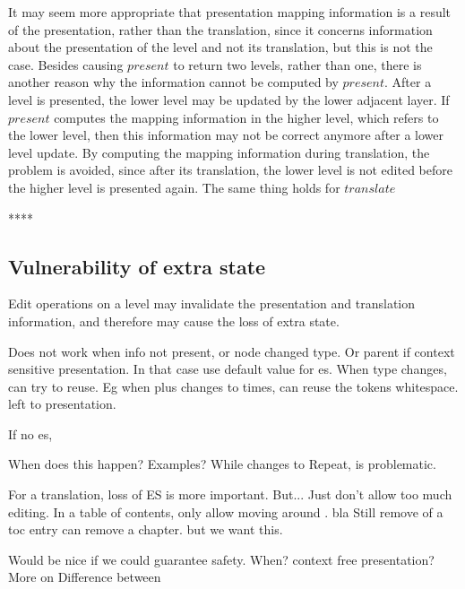 It may seem more appropriate that presentation mapping information is a result of the presentation, rather than the translation, since it concerns information about the presentation of the level and not its translation, but this is not the case. Besides causing $present$ to return two levels, rather than one, there is another reason why the information cannot be computed by $present$. After a level is presented, the lower level may be updated by the lower adjacent layer. If $present$ computes the mapping information in the higher level, which refers to the lower level, then this information may not be correct anymore after a lower level update. By computing the mapping information during translation, the problem is avoided, since after its translation, the lower level is not edited before the higher level is presented again. The same thing holds for $translate$


****

%										
%										
\subsection{Vulnerability of extra state}

Edit operations on a level may invalidate the presentation and translation information, and therefore may cause the loss of extra state. 



Does not work when info not present, or node changed type. Or parent if context sensitive presentation. In that case use default value for es. When type changes, can try to reuse. Eg when plus changes to times, can reuse the tokens whitespace. left to presentation.

If no es, 

When does this happen? Examples?
 While changes to Repeat, is problematic.


For a translation, loss of ES is more important. But... Just don't allow too much editing. In a table of contents, only allow moving around . bla Still remove of a toc entry can remove a chapter. but we want this.

Would be nice if we could guarantee safety. When? context free presentation?More on Difference between 

